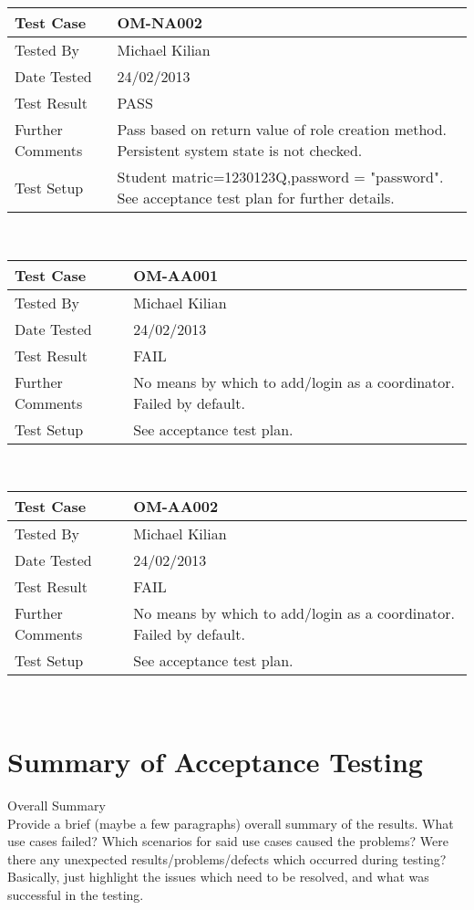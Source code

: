 \documentclass{l3deliverable}
\begin{document}
\begin{tabular}{lp{10cm}}
\hline 
\textbf{Test Case} & OM-NA002\tabularnewline
\hline 
\hline 
Tested By & Michael Kilian\tabularnewline
\hline 
Date Tested & 24/02/2013\tabularnewline
\hline 
Test Result & PASS\tabularnewline
\hline
Further Comments & Pass based on return value of role creation method. Persistent system state is not checked. \tabularnewline
\hline
Test Setup & Student matric=1230123Q,password = "password". See acceptance test plan for further details.\tabularnewline
\hline
\end{tabular}\\

\begin{tabular}{lp{10cm}}
\hline 
\textbf{Test Case} & OM-AA001\tabularnewline
\hline 
\hline 
Tested By & Michael Kilian\tabularnewline
\hline 
Date Tested & 24/02/2013\tabularnewline
\hline 
Test Result & FAIL\tabularnewline
\hline
Further Comments & No means by which to add/login as a coordinator. Failed by default.\tabularnewline
\hline
Test Setup & See acceptance test plan.\tabularnewline
\hline
\end{tabular}\\

\begin{tabular}{lp{10cm}}
\hline 
\textbf{Test Case} & OM-AA002\tabularnewline
\hline 
\hline 
Tested By & Michael Kilian\tabularnewline
\hline 
Date Tested & 24/02/2013\tabularnewline
\hline 
Test Result & FAIL\tabularnewline
\hline
Further Comments & No means by which to add/login as a coordinator. Failed by default.\tabularnewline
\hline
Test Setup & See acceptance test plan.\tabularnewline
\hline
\end{tabular}\\
\section{Summary of Acceptance Testing}
Overall Summary \\
Provide a brief (maybe a few paragraphs) overall summary of the results. What use cases failed? Which scenarios for said use cases caused the problems? Were there any unexpected results/problems/defects which occurred during testing? Basically, just highlight the issues which need to be resolved, and what was successful in the testing. 

\appendix
\end{document}
